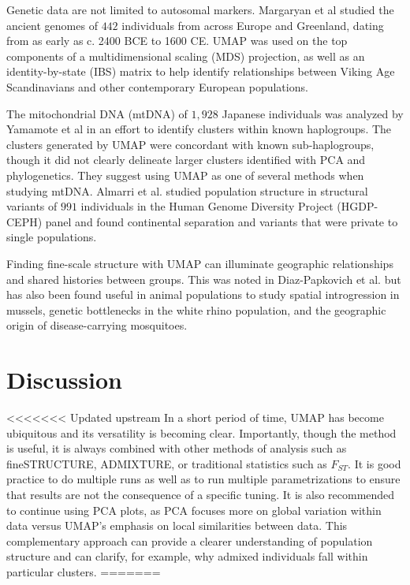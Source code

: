 \documentclass[12pt]{article}
\begin{document}
Genetic data are not limited to autosomal markers. Margaryan et al\cite{margaryan_population_2019} studied the ancient genomes of $442$ individuals from across Europe and Greenland, dating from as early as c. 2400 BCE to 1600 CE. UMAP was used on the top components of a multidimensional scaling (MDS) projection, as well as an identity-by-state (IBS) matrix to help identify relationships between Viking Age Scandinavians and other contemporary European populations. 

The mitochondrial DNA (mtDNA) of $1,928$ Japanese individuals was analyzed by Yamamote et al in an effort to identify clusters within known haplogroups\cite{yamamoto_genetic_2020}. The clusters generated by UMAP were concordant with known sub-haplogroups, though it did not clearly delineate larger clusters identified with PCA and phylogenetics. They suggest using UMAP as one of several methods when studying mtDNA. Almarri et al.\cite{almarri_population_2020} studied population structure in structural variants of $991$ individuals in the Human Genome Diversity Project (HGDP-CEPH) panel and found continental separation and variants that were private to single populations.

Finding fine-scale structure with UMAP can illuminate geographic relationships and shared histories between groups. This was noted in Diaz-Papkovich et al.\cite{diaz-papkovich_umap_2019} but has also been found useful in animal populations to study spatial introgression in mussels\cite{simon_local_2019}, genetic bottlenecks in the white rhino population\cite{sanchez-barreiro_historical_2020}, and the geographic origin of disease-carrying mosquitoes\cite{consortium_genome_2020}\cite{schmidt_population_2020}.

\section*{Discussion}
<<<<<<< Updated upstream
In a short period of time, UMAP has become ubiquitous and its versatility is becoming clear. Importantly, though the method is useful, it is always combined with other methods of analysis such as fineSTRUCTURE\cite{lawson2012inference}, ADMIXTURE\cite{alexander2009fast}, or traditional statistics such as $F_{ST}$. It is good practice to do multiple runs as well as to run multiple parametrizations to ensure that results are not the consequence of a specific tuning. It is also recommended to continue using PCA plots, as PCA focuses more on global variation within data versus UMAP's emphasis on local similarities between data. This complementary approach can provide a clearer understanding of population structure and can clarify, for example, why admixed individuals fall within particular clusters.
=======
\end{document}

